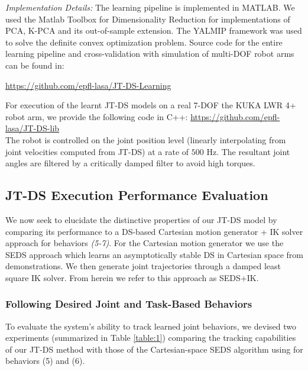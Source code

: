 \documentclass[letterpaper, 10 pt, conference,fleqn]{ieeeconf}
\begin{document}
\textit{Implementation Details:} The learning pipeline is implemented in MATLAB. We used the Matlab Toolbox for Dimensionality Reduction \cite{Maaten08dimensionalityreduction} for implementations of PCA, K-PCA and its out-of-sample extension. The YALMIP framework \cite{lofberg2004yalmip} was used to solve the definite convex optimization problem. Source code for the entire learning pipeline and cross-validation with simulation of multi-DOF robot arms can be found in:
\footnotesize  \centerline{\underline{\url{https://github.com/epfl-lasa/JT-DS-Learning}}}
\normalsize

For execution of the learnt JT-DS models on a real 7-DOF the KUKA LWR 4+ robot arm, we provide the following code in C++:
\footnotesize \underline{\url{https://github.com/epfl-lasa/JT-DS-lib}}\\
\normalsize
The robot is controlled on the joint position level (linearly interpolating from joint velocities computed from JT-DS) at a rate of $ 500 $ Hz. The resultant joint angles are filtered by a critically damped filter to avoid high torques.


\subsection{JT-DS Execution Performance Evaluation}
We now seek to elucidate the distinctive properties of our JT-DS model by comparing its performance to a DS-based Cartesian motion generator + IK solver approach for behaviors \textit{(5-7)}. For the Cartesian motion generator we use the SEDS approach \cite{khansari2011learning} which learns an asymptotically stable DS in Cartesian space from demonstrations. We then generate joint trajectories through a damped least square IK solver. From herein we refer to this approach as SEDS+IK.

\subsubsection{Following Desired Joint and Task-Based Behaviors}
To evaluate the system's ability to track learned joint behaviors, we devised two experiments (summarized in Table \ref{table:1}) comparing the tracking capabilities of our JT-DS method with those of the Cartesian-space SEDS  algorithm using  for behaviors (5) and (6).
\end{document}
